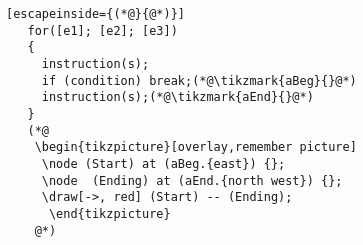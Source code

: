 \documentclass{beamer}
\newcommand{\tikzmark}[2]{%
   \tikz[overlay,remember picture] \node[text=black,
       inner sep=2pt] (#1) {#2};}
\begin{document}
 \begin{frame}[fragile]{}
 \begin{lstlisting}[escapeinside={(*@}{@*)}]
   for([e1]; [e2]; [e3])
   {
     instruction(s);
     if (condition) break;(*@\tikzmark{aBeg}{}@*)
     instruction(s);(*@\tikzmark{aEnd}{}@*)
   }
   (*@
    \begin{tikzpicture}[overlay,remember picture]
     \node (Start) at (aBeg.{east}) {};
     \node  (Ending) at (aEnd.{north west}) {};
     \draw[->, red] (Start) -- (Ending);
      \end{tikzpicture}
    @*) 
 \end{lstlisting}

\end{frame}
\end{document}
